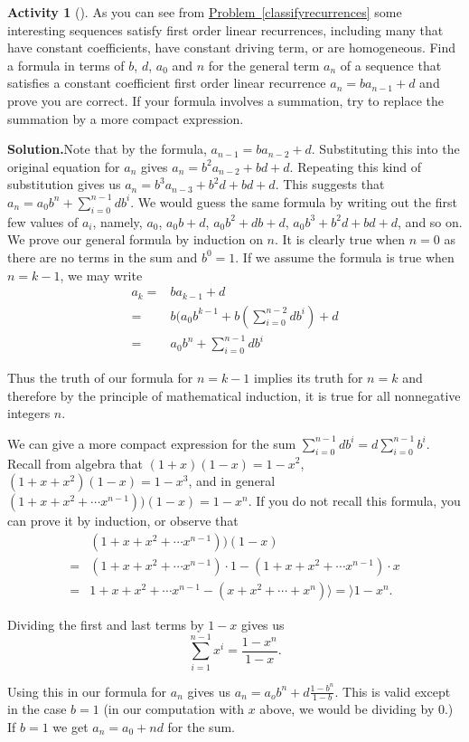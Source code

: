 \documentclass[10pt,]{book}
\theoremstyle{plain}
\theoremstyle{definition}
\newtheorem{activity}[project]{Activity}
\numberwithin{equation}{chapter}
\newcommand{\amp}{&}
\begin{document}
\begin{activity}[]\label{firstordlinconst}
As you can see from \hyperref[classifyrecurrences]{Problem~\ref{classifyrecurrences}} some interesting sequences satisfy first order linear recurrences, including many that have constant coefficients, have constant driving term, or are homogeneous. Find a formula in terms of \(b\), \(d\), \(a_0\) and \(n\) for the general term \(a_n\) of a sequence that satisfies a constant coefficient first order linear recurrence \(a_n = ba_{n-1} + d\) and prove you are correct. If your formula involves a summation, try to replace the summation by a more compact expression.%
\par\medskip\noindent%
\textbf{Solution.}\quad Note that by the formula, \(a_{n-1}=ba_{n-2} +d\). Substituting this into the original equation for \(a_n\) gives \(a_n=b^2a_{n-2}+bd +d\). Repeating this kind of substitution gives us \(a_n=b^3a_{n-3} +b^2d +bd +d\). This suggests that \(a_n = a_0b^n +\sum_{i=0}^{n-1}db^i\). We would guess the same formula by writing out the first few values of \(a_i\), namely, \(a_0\), \(a_0b+d\), \(a_0b^2+db+d\), \(a_0b^3+b^2d+bd+d\), and so on. We prove our general formula by induction on \(n\). It is clearly true when \(n=0\) as there are no terms in the sum and \(b^0=1\). If we assume the formula is true when \(n=k-1\), we may write%
\begin{align*}
a_k  =\amp  ba_{k-1}+d\\
=\amp b(a_0b^{k-1}+ b\left(\sum_{i=0}^{n-2}db^i\right) +d\\
=\amp a_0b^n +\sum_{i=0}^{n-1}db^i
\end{align*}
%
\par
Thus the truth of our formula for \(n=k-1\) implies its truth for \(n=k\) and therefore by the principle of mathematical induction, it is true for all nonnegative integers \(n\).%
\par
We can give a more compact expression for the sum \(\sum_{i=0}^{n-1}db^i=d\sum_{i=0}^{n-1}b^i\). Recall from algebra that \((1+x)(1-x)= 1-x^2\), \((1+x+x^2)(1-x) = 1-x^3\), and in general \((1+x+x^2+\cdots
x^{n-1}))(1-x) = 1-x^n\). If you do not recall this formula, you can prove it by induction, or observe that%
\begin{align*}
\amp (1+x+x^2+\cdots
x^{n-1}))(1-x)\\
=\amp  (1+x+x^2+\cdots
x^{n-1})\cdot 1-(1+x+x^2+\cdots
x^{n-1})\cdot x\\
=\amp  1+x+x^2+\cdots x^{n-1}-(x+x^2+\cdots+x^n)\rangle =\rangle  1-x^n.
\end{align*}
%
\par
Dividing the first and last terms by \(1-x\) gives us%
\begin{equation*}
\sum_{i=1}^{n-1}x^i=\frac{1-x^n}{1-x}.
\end{equation*}
%
\par
Using this in our formula for \(a_n\) gives us \(a_n =a_ob^n+d\frac{1-b^n}{1-b}.\) This is valid except in the case \(b=1\) (in our computation with \(x\) above, we would be dividing by 0.) If \(b=1\) we get \(a_n =a_0 +nd\) for the sum.%
\end{activity}
\typeout{************************************************}
\typeout{************************************************}
\end{document}

